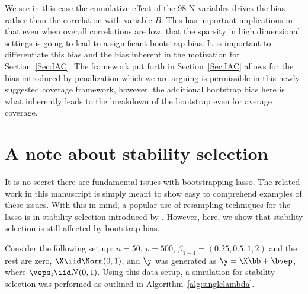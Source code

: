 We see in this case the cumulative effect of the 98 N variables drives the bias rather than the correlation with variable $B$. This has important implications in that even when overall correlations are low, that the sparsity in high dimensional settings is going to lead to a significant bootstrap bias. It is important to differentiate this bias and the bias inherent in the motivation for Section~\ref{Sec:IAC}. The framework put forth in Section~\ref{Sec:IAC} allows for the bias introduced by penalization which we are arguing is permissible in this newly suggested coverage framework, however, the additional bootstrap bias here is what inherently leads to the breakdown of the bootstrap even for average coverage.

\clearpage
\section{A note about stability selection}
\label{sup:stability}

It is no secret there are fundamental issues with bootstrapping lasso. The related work in this manuscript is simply meant to show easy to comprehend examples of these issues. With this in mind, a popular use of resampling techniques for the lasso is in stability selection introduced by  \cite{Meinshausen2010}. However, here, we show that stability selection is still affected by bootstrap bias.

Consider the following set up: $n = 50$, $p = 500$, $\beta_{1-4} = (0.25, 0.5, 1, 2)$ and the rest are zero, $\X \iid \Norm(0, 1)$, and $\y$ was generated as $\y = \X\bb + \bvep$, where $\veps_i \iid N(0, 1)$. Using this data setup, a simulation for stability selection was performed as outlined in Algorithm~\ref{alg:singlelambda}.

